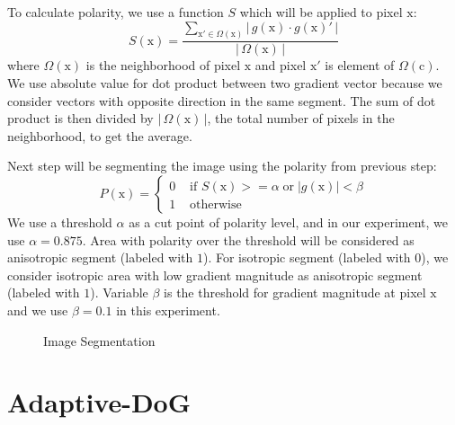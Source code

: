 To calculate polarity, we use a function $S$ which will be applied to pixel $\mbox{x}$:
\begin{equation}
	S(\mbox{x})=\frac{\sum\limits_{\mathrm{x}' \in \Omega (\mathrm{x})}\left|\,g(\mbox{x}) \cdot g(\mbox{x})'\,|\right.}
		{\left|\,\Omega(\mathrm{x})\,|\right.}
\end{equation}
where $\Omega(\mbox{x})$ is the neighborhood of pixel $\mbox{x}$ and pixel $\mbox{x}'$ is element of $\Omega(\mbox{c})$. We use absolute value for dot product between two gradient vector because we consider vectors with opposite direction in the same segment. The sum of dot product is then divided by ${\left|\,\Omega(\mathrm{x})\,|\right.}$, the total number of pixels in the neighborhood, to get the average.

Next step will be segmenting the image using the polarity from previous step:
\begin{equation}
	P(\mbox{x})=
		\left\{
			\begin{array}{ll}
				0&\mbox{ if }S(\mbox{x}) >= \alpha \;\mbox{or}\; \left|g(\mbox{x})|\right. < \beta
				\\
				1&\mbox{ otherwise }
			\end{array}
		\right.
\end{equation}
We use a threshold $\alpha$ as a cut point of polarity level, and in our experiment, we use $\alpha = 0.875$. Area with polarity over the threshold will be considered as anisotropic segment (labeled with $1$). For isotropic segment (labeled with $0$), we consider isotropic area with low gradient magnitude as anisotropic segment (labeled with $1$). Variable $\beta$ is the threshold for gradient magnitude at pixel $\mbox{x}$ and we use $\beta = 0.1$ in this experiment. 
\begin{figure}[H]
	\centering
	\caption{Image Segmentation}
\end{figure}

\section{Adaptive-DoG}

